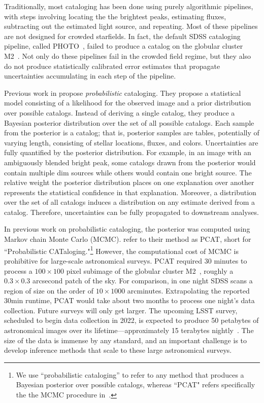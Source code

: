 Traditionally, most cataloging has been done using purely algorithmic pipelines, with steps involving locating the the brightest peaks, estimating fluxes, subtracting out the estimated light source, and repeating. 
Most of these pipelines are not designed for crowded starfields.
In fact, the default SDSS cataloging pipeline, called PHOTO~\cite{lupton2001sdss}, failed to 
produce a catalog on 
the globular cluster M2~\cite{Portillo_2017}. 
Not only do these pipelines fail in the crowded field
regime, but they also do not produce statistically calibrated error estimates that propagate 
uncertainties accumulating in each step of the pipeline. 

Previous work in \cite{Brewer_2013, Portillo_2017, Feder_2019}
propose {\itshape probabilistic} cataloging.
They propose a statistical model consisting of a likelihood for the observed image and a prior distribution over possible catalogs. Instead of deriving a single catalog, they produce a Bayesian posterior distribution over the set of all possible catalogs. 
Each sample from the posterior is a catalog; that is, posterior samples are tables, potentially of varying length, consisting of stellar locations, fluxes, and colors. 
Uncertainties are fully quantified by the posterior distribution. 
For example, in an image with an ambiguously blended bright peak, some catalogs drawn from the posterior would contain multiple dim sources while others would contain one bright source. 
The relative weight the posterior distribution places on one explanation over another represents the statistical confidence in that explanation. 
Moreover, a distribution over the set of all catalogs induces a distribution on any estimate derived from a catalog. Therefore, uncertainties can be fully propagated to downstream analyses.  

In previous work on probabilistic cataloging, the posterior was computed using Markov chain Monte Carlo (MCMC).
\cite{Portillo_2017, Feder_2019} refer to their method as PCAT, short for ``Probabilistic CATaloging."\footnote{
We use ``probabilistic cataloging'' to refer to any method that produces a Bayesian posterior over possible catalogs, whereas ``PCAT" refers specifically the the MCMC procedure in~\cite{Portillo_2017, Feder_2019}. }
However, the computational cost of MCMC is prohibitive for large-scale astronomical surveys. 
PCAT required 30 minutes to process a $100\times 100$ pixel subimage of the globular cluster M2~\cite{Feder_2019}, roughly a $0.3\times0.3$ arcsecond patch of the sky.
For comparison, in one night SDSS scans a region of size on the order of $10 \times 1000$ arcminutes. Extrapolating the reported 30min runtime, PCAT would take about two months to process one night's data collection.
Future surveys will only get larger. 
The upcoming LSST survey, scheduled to begin data collection in 2022, is expected to produce 50 petabytes of astronomical images over its lifetime---approximately 15 terabytes nightly~\cite{LSST_about}. 
The size of the data is immense by any standard, and an important challenge is to develop inference methods that scale to these large astronomical surveys. 

